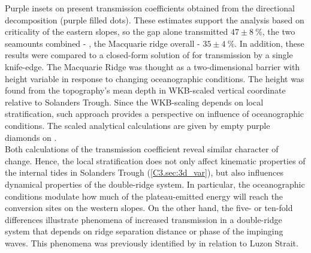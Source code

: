 \documentclass[12pt]{article}
\begin{document}
Purple insets on  present transmission coefficients 
obtained from the directional decomposition (purple filled dots). These estimates support the 
analysis based on 
criticality of the eastern slopes, so the gap alone transmitted $47 \pm 8~\%$, the two seamounts 
combined - , the Macquarie ridge overall 
 - $35 \pm 4~\%$. In addition, these results were compared to a closed-form solution of 
\citep{larsen1969internal} for transmission by a single knife-edge. The Macquarie Ridge was thought 
as a two-dimensional barrier with height variable in response to changing oceanographic conditions. 
The height 
was found from the topography's mean depth in WKB-scaled vertical coordinate 
\citep{althaus2003internal} relative to Solanders Trough. Since the WKB-scaling depends on local 
stratification, such approach provides a perspective on influence of 
oceanographic conditions. The scaled analytical calculations are given by empty purple diamonds on 
.\\

Both calculations of the transmission coefficient reveal similar character of change. Hence, the 
local stratification does not only affect kinematic properties of the internal tides in Solanders 
Trough (\ref{C3.sec:3d_var}), but also influences dynamical properties of the double-ridge system. 
In particular, the oceanographic conditions modulate how much of the plateau-emitted energy will 
reach the conversion sites on the western slopes. On the other hand, the five- or ten-fold 
differences illustrate phenomena of increased transmission in a double-ridge system that depends 
on ridge separation distance or phase of the impinging waves. This phenomena was previously 
identified by \citep{klymak2013parameterizing} in relation to Luzon Strait.\\
\end{document}
